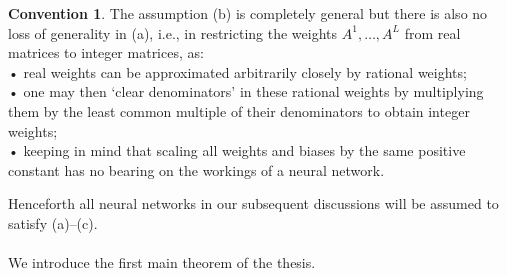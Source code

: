 \documentclass{article}
\theoremstyle{definition}
\newtheorem{convention}[theorem]{Convention}
\begin{document}
\begin{convention}\hspace{1sp}\cite{zhang2018tropical}
The assumption (b) is completely general but there is also no loss of generality in (a), i.e., in restricting the weights $A^{1}, \dots ,A^{L}$
from real matrices to integer matrices, as: \\
• real weights can be approximated arbitrarily closely by
rational weights; \\
• one may then ‘clear denominators’ in these rational
weights by multiplying them by the least common multiple of their denominators to obtain integer weights; \\
• keeping in mind that scaling all weights and biases
by the same positive constant has no bearing on the
workings of a neural network.
\end{convention}

Henceforth all neural networks in our subsequent discussions will be assumed to satisfy (a)–(c). \\ \\
We introduce the first main theorem of the thesis.
\end{document}
